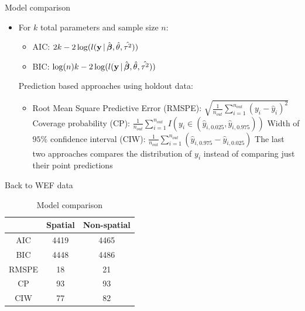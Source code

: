 \begin{frame}{Model comparison}
	\begin{itemize}
		\item For $k$ total parameters and sample size $n$:
		\begin{itemize}
			\item \alert{AIC:} $2k - 2 \log (l(\textbf{y} \,|\, \hat{\mbox{\boldmath $ \beta $}}, \hat\theta, \hat{\tau^2}))$
			\item \alert{BIC:} $\log(n) k - 2 \log (l(\textbf{y} \,|\, \hat{\mbox{\boldmath $ \beta $}}, \hat\theta, \hat{\tau^2}))$
		\end{itemize}
		\myitem Prediction based approaches using holdout data:
		\begin{itemize}
			\item Root Mean Square Predictive Error (\alert{RMSPE}): $\sqrt{\frac 1{n_{out}}\sum_{i=1}^{n_{out}} (y_i - \hat y_i)^2}$
			\myitem Coverage probability (\alert{CP}): $\frac 1{n_{out}} \sum_{i=1}^{n_{out}} I(y_i \in (\hat y_{i,0.025}, \hat y_{i,0.975}))$
			\myitem Width of $95\%$ confidence interval (\alert{CIW}): $\frac 1{n_{out}} \sum_{i=1}^{n_{out}} (\hat y_{i,0.975}- \hat y_{i,0.025})$
			\myitem The last two approaches compares the distribution of $y_i$ instead of comparing just their point predictions
		\end{itemize}
	\end{itemize}
\end{frame}

\begin{frame}{Back to WEF data}
		\begin{table}
			\caption{Model comparison}
			\begin{tabular}{@{} ccc @{}}
				\toprule
				& Spatial & Non-spatial\\
				\midrule
				AIC & 4419 & 4465\\
				BIC & 4448 & 4486\\
				\midrule
				RMSPE & 18 & 21\\
				CP & 93 & 93\\
				CIW & 77 & 82\\
				\bottomrule
			\end{tabular}
		\end{table}
\end{frame}	

